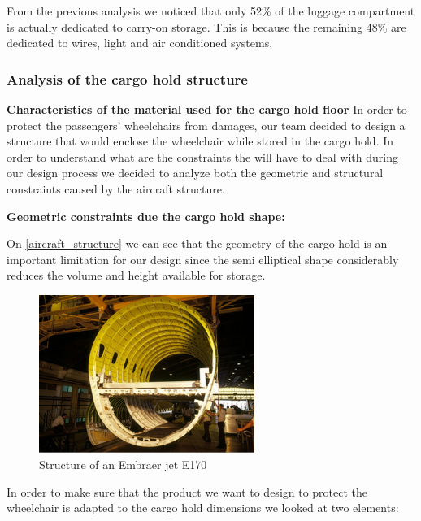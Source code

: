 From the previous analysis we noticed that only 52\% of the luggage compartment is actually dedicated to carry-on storage. This is because the remaining 48\% are dedicated to wires, light and air conditioned systems.

\subsubsection*{Analysis of the cargo hold structure}

\textbf{Characteristics of the material used for the cargo hold floor}
In order to protect the passengers’ wheelchairs from damages, our team decided to design a structure that would enclose the wheelchair while stored in the cargo hold. In order to understand what are the constraints the will have to deal with during our design process we decided to analyze both the geometric and structural constraints caused by the aircraft structure.

\textbf{Geometric constraints due the cargo hold shape:}

On \ref{aircraft_structure} we can see that the geometry of the cargo hold is an important limitation for our design since the semi elliptical shape considerably reduces the volume and height available for storage.

\begin{figure}[h]
\centering
\includegraphics[width=7cm]{images/aircraft_structure.png}
\caption{Structure of an Embraer jet E170 \cite{embraer_struct}}
\label{fig:aircraft_structure}
\end{figure}

In order to make sure that the product we want to design to protect the wheelchair is adapted to the cargo hold dimensions we looked at two elements:

